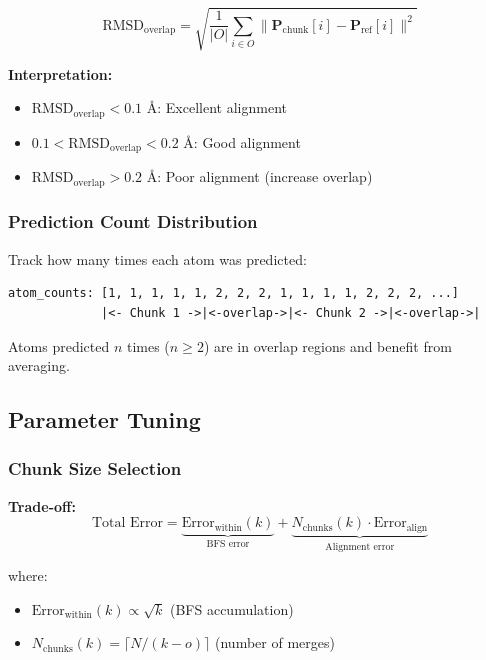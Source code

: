 \documentclass[11pt,a4paper]{article}
\begin{document}
\begin{equation}
\text{RMSD}_{\text{overlap}} = \sqrt{\frac{1}{|O|} \sum_{i \in O} \|\mathbf{P}_{\text{chunk}}[i] - \mathbf{P}_{\text{ref}}[i]\|^2}
\end{equation}

\textbf{Interpretation:}
\begin{itemize}
    \item $\text{RMSD}_{\text{overlap}} < 0.1$ Å: Excellent alignment
    \item $0.1 < \text{RMSD}_{\text{overlap}} < 0.2$ Å: Good alignment
    \item $\text{RMSD}_{\text{overlap}} > 0.2$ Å: Poor alignment (increase overlap)
\end{itemize}

\subsubsection{Prediction Count Distribution}

Track how many times each atom was predicted:

\begin{lstlisting}
atom_counts: [1, 1, 1, 1, 1, 2, 2, 2, 1, 1, 1, 1, 2, 2, 2, ...]
             |<- Chunk 1 ->|<-overlap->|<- Chunk 2 ->|<-overlap->|
\end{lstlisting}

Atoms predicted $n$ times ($n \geq 2$) are in overlap regions and benefit from averaging.

\subsection{Parameter Tuning}

\subsubsection{Chunk Size Selection}

\textbf{Trade-off:}
\begin{equation}
\text{Total Error} = \underbrace{\text{Error}_{\text{within}}(k)}_{\text{BFS error}} + \underbrace{N_{\text{chunks}}(k) \cdot \text{Error}_{\text{align}}}_{\text{Alignment error}}
\end{equation}

where:
\begin{itemize}
    \item $\text{Error}_{\text{within}}(k) \propto \sqrt{k}$ (BFS accumulation)
    \item $N_{\text{chunks}}(k) = \lceil N / (k - o) \rceil$ (number of merges)
\end{itemize}
\end{document}
